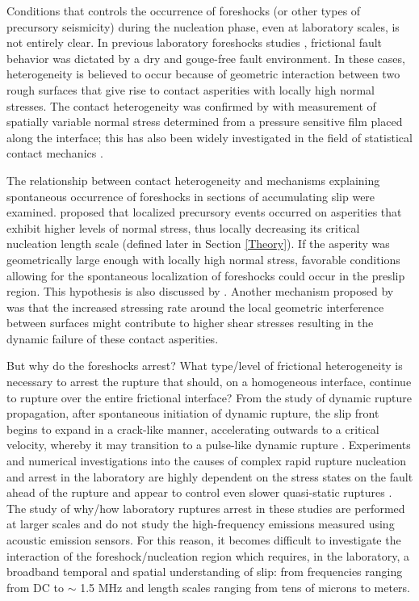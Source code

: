 \documentclass[preprint,1p, 10pt,authoryear]{elsarticle}
\begin{document}
Conditions that controls the occurrence of foreshocks (or other types of precursory seismicity) during the nucleation phase, even at laboratory scales, is not entirely clear. In previous laboratory foreshocks studies \citep{McLaskey2013, Selvadurai2015}, frictional fault behavior was dictated by a dry and gouge-free fault environment.  In these cases, heterogeneity is believed to occur because of geometric interaction between two rough surfaces that give rise to contact asperities with locally high normal stresses.  The contact heterogeneity was confirmed by \citet{Selvadurai2017} with measurement of spatially variable normal stress determined from a pressure sensitive film placed along the interface; this has also been widely investigated in the field of statistical contact mechanics \citep[e.g.][]{Greenwood1966,Johnson1985, Persson2006}. 

The relationship between contact heterogeneity and mechanisms explaining spontaneous occurrence of foreshocks in sections of accumulating slip were examined. \citet{Selvadurai2017} proposed that localized precursory events occurred on asperities that exhibit higher levels of normal stress, thus locally decreasing its critical nucleation length scale (defined later in Section \ref{Theory}). If the asperity was geometrically large enough with locally high normal stress, favorable conditions allowing for the spontaneous localization of foreshocks could occur in the preslip region. This hypothesis is also discussed by \citet{McLaskey2019}. Another mechanism proposed by \citet{McLaskey2013} was that the increased stressing rate around the local geometric interference between surfaces might contribute to higher shear stresses resulting in the dynamic failure of these contact asperities.  

But why do the foreshocks arrest? What type/level of frictional heterogeneity is necessary to arrest the rupture that should, on a homogeneous interface, continue to rupture over the entire frictional interface? From the study of dynamic rupture propagation, after spontaneous initiation of dynamic rupture, the slip front begins to expand in a crack-like manner, accelerating outwards to a critical velocity, whereby it may transition to a pulse-like dynamic rupture \citep{Heaton1990, Meier2016}. Experiments and numerical investigations into the causes of complex rapid rupture nucleation and arrest in the laboratory are highly dependent on the stress states on the fault ahead of the rupture \citep{Rubinstein2004, Rubinstein2006, Ben-David2010,Svetlizky2014,Fineberg2015, Maegawa2010, Tromborg2011, Kammer2012, Gabriel2012, Kammer2015} and appear to control even slower quasi-static ruptures \citep{Selvadurai2017a}. The study of why/how laboratory ruptures arrest in these studies are performed at larger scales and do not study the high-frequency emissions measured using acoustic emission sensors. For this reason, it becomes difficult to investigate the interaction of the foreshock/nucleation region which requires, in the laboratory, a broadband temporal and spatial understanding of slip: from frequencies ranging from DC to $\sim$ 1.5 MHz and length scales ranging from tens of microns to meters. 
\end{document}
